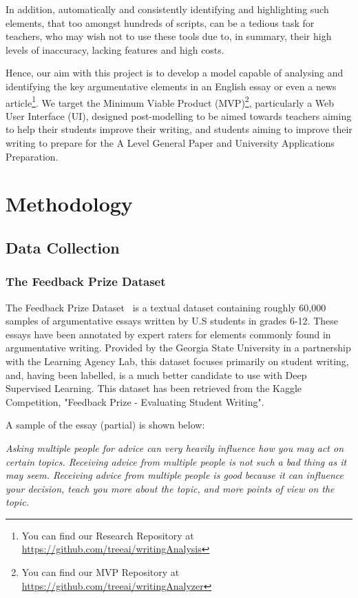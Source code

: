 \documentclass[12pt]{article}
\begin{document}
{In addition, automatically and consistently identifying and highlighting such elements, that too amongst hundreds of scripts, can be a tedious task for teachers, who may wish not to use these tools due to, in summary, their high levels of inaccuracy, lacking features and high costs.

Hence, our aim with this project is to develop a model capable of analysing and identifying the key argumentative elements in an English essay or even a news article\footnote{You can find our Research Repository at \url{https://github.com/treeai/writingAnalysis}}. We target the Minimum Viable Product (MVP)\footnote{You can find our MVP Repository at \url{https://github.com/treeai/writingAnalyzer}}, particularly a Web User Interface (UI), designed post-modelling to be aimed towards teachers aiming to help their students improve their writing, and students aiming to improve their writing to prepare for the A Level General Paper and University Applications Preparation.



\section{Methodology}

\subsection{Data Collection}

\subsubsection{The Feedback Prize Dataset}
\label{section:feedbackprize}
The Feedback Prize Dataset~\cite{feedbackprize} is a textual dataset containing roughly 60,000 samples of argumentative essays written by U.S students in grades 6-12. These essays have been annotated by expert raters for elements commonly found in argumentative writing. Provided by the Georgia State University in a partnership with the Learning Agency Lab, this dataset focuses primarily on student writing, and, having been labelled, is a much better candidate to use with Deep Supervised Learning. This dataset has been retrieved from the Kaggle Competition, "Feedback Prize - Evaluating Student Writing".

A sample of the essay (partial) is shown below:
\begin{displayquote}
\textit{Asking multiple people for advice can very heavily influence how you may act on certain topics. Receiving advice from multiple people is not such a bad thing as it may seem. Receiving advice from multiple people is good because it can influence your decision, teach you more about the topic, and more points of view on the topic.}


\end{displayquote}}
\end{document}
